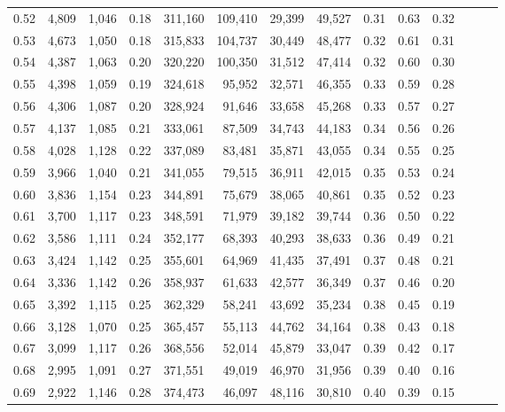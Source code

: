 \begin{tabular}{rrrrrrrrrrrrrr}
0.52 &   4,809 &  1,046 &  0.18 &  311,160 &  109,410 &  29,399 &  49,527 &  0.31 &  0.63 &      0.32 \\
0.53 &   4,673 &  1,050 &  0.18 &  315,833 &  104,737 &  30,449 &  48,477 &  0.32 &  0.61 &      0.31 \\
0.54 &   4,387 &  1,063 &  0.20 &  320,220 &  100,350 &  31,512 &  47,414 &  0.32 &  0.60 &      0.30 \\
0.55 &   4,398 &  1,059 &  0.19 &  324,618 &   95,952 &  32,571 &  46,355 &  0.33 &  0.59 &      0.28 \\
0.56 &   4,306 &  1,087 &  0.20 &  328,924 &   91,646 &  33,658 &  45,268 &  0.33 &  0.57 &      0.27 \\
0.57 &   4,137 &  1,085 &  0.21 &  333,061 &   87,509 &  34,743 &  44,183 &  0.34 &  0.56 &      0.26 \\
0.58 &   4,028 &  1,128 &  0.22 &  337,089 &   83,481 &  35,871 &  43,055 &  0.34 &  0.55 &      0.25 \\
0.59 &   3,966 &  1,040 &  0.21 &  341,055 &   79,515 &  36,911 &  42,015 &  0.35 &  0.53 &      0.24 \\
0.60 &   3,836 &  1,154 &  0.23 &  344,891 &   75,679 &  38,065 &  40,861 &  0.35 &  0.52 &      0.23 \\
0.61 &   3,700 &  1,117 &  0.23 &  348,591 &   71,979 &  39,182 &  39,744 &  0.36 &  0.50 &      0.22 \\
0.62 &   3,586 &  1,111 &  0.24 &  352,177 &   68,393 &  40,293 &  38,633 &  0.36 &  0.49 &      0.21 \\
0.63 &   3,424 &  1,142 &  0.25 &  355,601 &   64,969 &  41,435 &  37,491 &  0.37 &  0.48 &      0.21 \\
0.64 &   3,336 &  1,142 &  0.26 &  358,937 &   61,633 &  42,577 &  36,349 &  0.37 &  0.46 &      0.20 \\
0.65 &   3,392 &  1,115 &  0.25 &  362,329 &   58,241 &  43,692 &  35,234 &  0.38 &  0.45 &      0.19 \\
0.66 &   3,128 &  1,070 &  0.25 &  365,457 &   55,113 &  44,762 &  34,164 &  0.38 &  0.43 &      0.18 \\
0.67 &   3,099 &  1,117 &  0.26 &  368,556 &   52,014 &  45,879 &  33,047 &  0.39 &  0.42 &      0.17 \\
0.68 &   2,995 &  1,091 &  0.27 &  371,551 &   49,019 &  46,970 &  31,956 &  0.39 &  0.40 &      0.16 \\
0.69 &   2,922 &  1,146 &  0.28 &  374,473 &   46,097 &  48,116 &  30,810 &  0.40 &  0.39 &      0.15 \\

\end{tabular}
